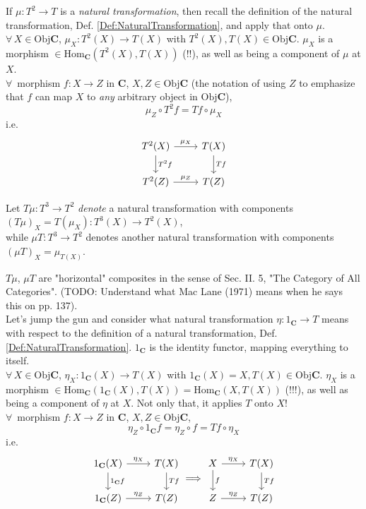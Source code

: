 \documentclass[10pt]{amsart}
\begin{document}
\begin{multicols*}{2}
If $\mu:T^2 \to T$ is a \emph{natural transformation}, then recall the definition of the natural transformation, Def. \ref{Def:NaturalTransformation}, and apply that onto $\mu$. \\

$\forall \, X \in \text{Obj}{\mathbf{C}}$, $\mu_X: T^2(X) \to T(X)$ with $T^2(X), T(X) \in \text{Obj}{\mathbf{C}}$. $\mu_X$ is a morphism $\in \text{Hom}_{\mathbf{C}}(T^2(X), T(X))$ (!!), as well as being a component of $\mu$ at $X$. \\

$\forall \,$ morphism $f: X\to Z$ in $\mathbf{C}$, $X, Z \in \text{Obj}{\mathbf{C}}$ (the notation of using $Z$ to emphasize that $f$ can map $X$ to \emph{any} arbitrary object in $\text{Obj}{\mathbf{C}}$), 
\[
\mu_Z \circ T^2f = Tf \circ \mu_X 
\]
i.e. 
\[
\begin{tikzcd}
	T^2(X) \arrow{d}{T^2f} \arrow{r}{\mu_X} & T(X) \arrow{d}{Tf} \\
	T^2(Z) \arrow{r}{\mu_Z} & T(Z)
\end{tikzcd}
\]

Let $T\mu : T^3 \to T^2$ \emph{denote} a natural transformation with components $(T\mu)_X = T(\mu_X) : T^3(X) \to T^2(X)$, \\
while $\mu T: T^3\to T^2$ denotes another natural transformation with components $(\mu T)_X  = \mu_{T(X)}$.  

$T\mu$, $\mu T$ are "horizontal" composites in the sense of Sec. II. 5, "The Category of All Categories". (TODO: Understand what Mac Lane (1971) \cite{MacL1978} means when he says this on pp. 137). \\

Let's jump the gun and consider what natural transformation $\eta : 1_{\mathbf{C}} \to T$ means with respect to the definition of a natural transformation, Def. \ref{Def:NaturalTransformation}. $1_{\mathbf{C}}$ is the identity functor, mapping everything to itself. \\

$\forall \, X \in \text{Obj}{\mathbf{C}}$, $\eta_X: 1_{\mathbf{C}}(X) \to T(X)$ with $1_{\mathbf{C}}(X) = X, T(X) \in \text{Obj}{\mathbf{C}}$. $\eta_X$ is a morphism $\in \text{Hom}_{\mathbf{C}}(1_{\mathbf{C}}(X), T(X)) = \text{Hom}_{\mathbf{C}}(X, T(X))$ (!!!), as well as being a component of $\eta$ at $X$. Not only that, it applies $T$ onto $X$! \\

$\forall \,$ morphism $f: X\to Z$ in $\mathbf{C}$, $X, Z \in \text{Obj}{\mathbf{C}}$, 
\[
\eta_Z \circ 1_{\mathbf{C}}f = \eta_Z \circ f = Tf \circ \eta_X 
\]
i.e. 
\[
\begin{tikzcd}
1_{\mathbf{C}}(X) \arrow{d}{1_{\mathbf{C}}f} \arrow{r}{\eta_X} & T(X) \arrow{d}{Tf} \\
1_{\mathbf{C}}(Z) \arrow{r}{\eta_Z} & T(Z)
\end{tikzcd} \Longrightarrow 
\begin{tikzcd}
X \arrow{d}{f} \arrow{r}{\eta_X} & T(X) \arrow{d}{Tf} \\
Z \arrow{r}{\eta_Z} & T(Z)
\end{tikzcd}
\]


\end{multicols*}
\end{document}
